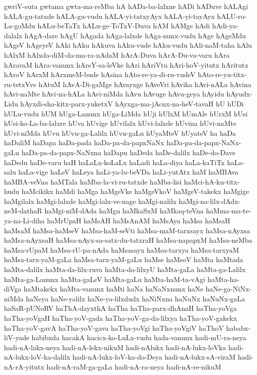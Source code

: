 {gwriV-suta
gwtama
gwta-ma-reMba
hA
hADa-ba-lalxne
hADi
hADuve
hALAgi
hALA-gu-tatxde
hALA-gu-vudu
hALA-yi-tatxyAyx
hALA-yi-tayAyx
hALU-ro-La-goMdu
hALu-beTaTx
hALu-ge-ToTxV-Duva
hAM
hAMge
hAdi
hAdi-ya-dalalx
hAgA-dare
hAgU
hAgada
hAga-lalxde
hAga-nunx-vudu
hAge
hAgeMdu
hAgeV
hAgeyeV
hAki
hAku
hAkuva
hAku-vude
hAku-vudu
hAli-naM-taha
hAlu
hAlxM
hAlxda-diM-da-ma-ra-nAdaM
hArA-Duva
hArA-Du-va-varu
hAra
hAravaM
hAra-vanunx
hAreY-sa-leVke
hAri
hAriVtu
hAri-hoV-yitutx
hAritutx
hAroV
hArxM
hArxmeM-bude
hAsina
hAto-re-ya-di-ru-vudeV
hAto-re-yu-titx-ru-tetxVve
hAtuM
hAvA-Di-gaMge
hAvayxge
hAveVri
hAvika
hAvi-nALa
hAvina
hAvi-naMte
hAvi-na-hALa
hAvi-niMda
hAvu
hAvuge
hAvu-geya
hAyidu
hAyudx-Lidu
hAyxdi-sha-kitx-parx-yuketxV
hAyxga-ma-jAcnx-na-heV-tavaH
hU
hUDi
hULu-vudu
hUM
hUga-Lanunx
hUga-LiMda
hUji
hUlxM
hUmAle
hUrxM
hUsi
hUsi-ko-La-ba-lalxre
hUva
hUvige
hUvilalx
hUvi-lalxde
hUvina
hUvi-naMte
hUvi-niMda
hUvu
hUvu-ga-Lalilx
hUvu-gaLu
hUyaMteV
hUyateV
ha
haDa
haDaliM
haDapa
haDa-pada
haDa-pa-da-papxNaNx
haDa-pa-da-papx-NaNx-gaLu
haDa-pa-da-papx-NaNxna
haDapu
haDeda
haDe-dalilx
haDe-do-Dave
haDedu
haDe-varu
haH
haLaLx-koLaLx
haLadi
haLa-diya
haLa-kaTiTx
haLa-salu
haLa-vige
haLeV
haLeya
haLi-ya-lu-beVDa
haLi-yutAtx
haM
haMBAva
haMBA-veVna
haMTala
haMba-la-vi-ru-tatxde
haMba-lisi
haMci-hA-ku-titx-hudu
haMcikikx
haMdi
haMga
haMgeVke
haMgeVkoV
haMgeV-takekx
haMgige
haMgilalx
haMgi-lalxde
haMgi-lalx-ve-nage
haMgi-nalilx
haMgi-na-lilx-dAdx-neM-dathaR
haMgi-niM-dAda
haMgu
haMkaSxM
haMkaq-teVna
haMma-ma-te-ya-na-Li-diha
haMrUpaH
haMsAH
haMsAnAM
haMsAya
haMsa
haMsaH
haMsaM
haMsa-haMseV
haMsa-haM-seVti
haMsa-maM-tarxsayx
haMsa-nAyxsa
haMsa-nAyxsaH
haMsa-nAyx-sa-satx-du-tatxraH
haMsa-napapxM
haMsa-neMba
haMsa-rUpaM
haMsa-rU-pa-nAda
haMsasayx
haMsa-tarxya
haMsa-tarxyaM
haMsa-tarx-yaM-gaLa
haMsa-tarx-yaM-gaLu
haMse
haMsoV
haMta
haMtada
haMta-dalilx
haMta-da-lilx-ruva
haMta-da-lilxyU
haMta-gaLa
haMta-ga-Lalilx
haMta-ga-Lanunx
haMta-gaLeV
haMta-gaLu
haMta-haM-ta-vAgi
haMta-ha-diVga
haMtakekx
haMta-vanunx
haMti
haNa
haNaNxnunx
haNe
haNe-ga-NiNx-niMda
haNeya
haNe-yalilx
haNe-ya-lilxdudx
haNiNxna
haNuNx
haNuNx-gaLa
haSaR-pUNoRV
haThA-dayxthA
haTha
haTha-parx-dhAnaH
haTha-yoVga
haTha-yoVgaH
haTha-yoV-gada
haTha-yoV-ga-da-lilxya
haTha-yoV-gakekx
haTha-yoV-gavA
haTha-yoV-gava
haTha-yoVgi
haTha-yoVgiV
haThoV
hababx-liV-yade
habibxda
hacakA
hacicx-ko-LuLx-vudu
hada-vanunx
hadi-mU-ra-neya
hadi-nA-lakx-neya
hadi-nA-lekx-nikuM
hadi-nAlukx
hadi-nA-lukx-loVka
hadi-nA-lukx-loV-ka-dalilx
hadi-nA-lukx-loV-ka-do-Deya
hadi-nA-lukx-sA-viraM
hadi-nA-rA-yitutx
hadi-nA-raM-ga-gaLa
hadi-nA-ra-neya
hadi-nA-re-nikuM
}
